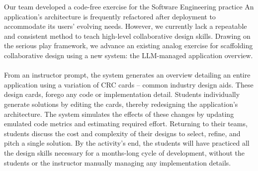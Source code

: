 Our team developed a code-free exercise for the Software Engineering practice  An application’s architecture is frequently refactored after deployment to accommodate its users’ evolving needs. However, we currently lack a repeatable and consistent method to teach high-level collaborative design skills. Drawing on the serious play framework, we advance an existing analog exercise for scaffolding collaborative design using a new system: the LLM-managed application overview.
\\ \\ 
From an instructor prompt, the system generates an overview detailing an entire application using a variation of CRC cards – common industry design aids. These design cards, forego any code or implementation detail. Students individually generate solutions by editing the cards, thereby redesigning the application’s architecture. The system simulates the effects of these changes by updating emulated code metrics and estimating required effort. Returning to their teams, students discuss the cost and complexity of their designs to select, refine, and pitch a single solution. By the activity’s end, the students will have practiced all the design skills necessary for a months-long cycle of development, without the students or the instructor manually managing any implementation details.

